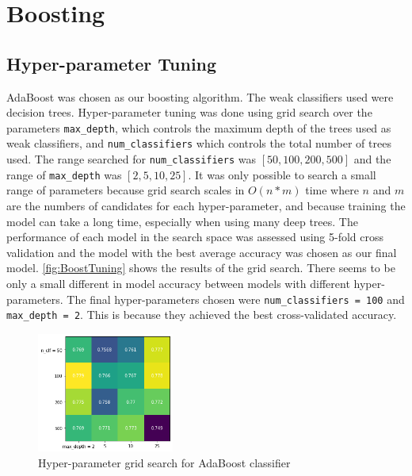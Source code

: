 \section{Boosting}
\subsection{Hyper-parameter Tuning}
AdaBoost was chosen as our boosting algorithm. The weak classifiers used were decision trees. Hyper-parameter tuning was done using grid search over the parameters \verb|max_depth|, which controls the maximum depth of the trees used as weak classifiers, and \verb|num_classifiers| which controls the total number of trees used. The range searched for \verb|num_classifiers| was $[50, 100, 200, 500]$ and the range of \verb|max_depth| was $[2, 5, 10, 25]$. It was only possible to search a small range of parameters because grid search scales in $O(n*m)$ time where $n$ and $m$ are the numbers of candidates for each hyper-parameter, and because training the model can take a long time, especially when using many deep trees. The performance of each model in the search space was assessed using 5-fold cross validation and the model with the best average accuracy was chosen as our final model. \autoref{fig:BoostTuning} shows the results of the grid search. There seems to be only a small different in model accuracy between models with different hyper-parameters. The final hyper-parameters chosen were \verb|num_classifiers = 100| and \verb|max_depth = 2|. This is because they achieved the best cross-validated accuracy. 

\begin{figure}
    \centering
    \includegraphics[width= 0.4\textwidth]{figures/hyperparam_tuning_boosting.png}
    \caption{Hyper-parameter grid search for AdaBoost classifier}
    \label{fig:BoostTuning}
\end{figure}


